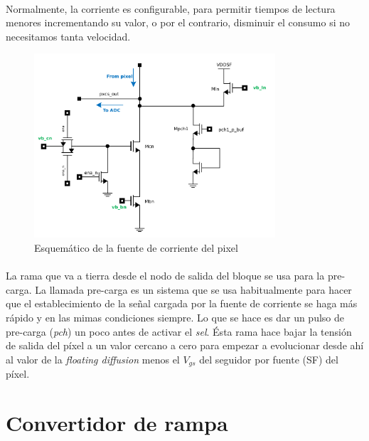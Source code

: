 \paragraph{}
Normalmente, la corriente es configurable, para permitir tiempos de lectura menores
incrementando su  valor, o por el contrario, disminuir el consumo si no necesitamos tanta
velocidad.

\begin{figure}[h]
	\centering
	\includegraphics[width=0.8\textwidth]{svg/pxcs_sch.pdf}
	\caption{Esquemático de la fuente de corriente del pixel}
	\label{fig:pxcs_sch}
\end{figure}

\paragraph{}
La rama que va a tierra desde el nodo de salida del bloque se usa para la pre-carga.
La llamada pre-carga es un sistema que se usa habitualmente para hacer que el
establecimiento de la señal cargada por la fuente de corriente se haga más rápido
y en las mimas condiciones siempre. Lo que se hace es dar un pulso de pre-carga
(\textit{pch}) un poco antes de activar el \textit{sel}. Ésta rama hace bajar la
tensión de salida del píxel a un valor cercano a cero para empezar a evolucionar
desde ahí al valor de la \textit{floating diffusion} menos el $V_{gs}$ del seguidor
por fuente (SF) del píxel.


\section{Convertidor de rampa}\label{cap:ro_sch_conv}

